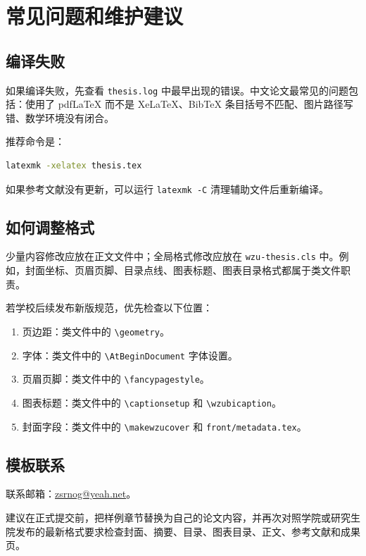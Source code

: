 \chapter{常见问题和维护建议}

\section{编译失败}

如果编译失败，先查看 \texttt{thesis.log} 中最早出现的错误。中文论文最常见的问题包括：使用了 pdfLaTeX 而不是 XeLaTeX、BibTeX 条目括号不匹配、图片路径写错、数学环境没有闭合。

推荐命令是：

\begin{lstlisting}[language=bash]
latexmk -xelatex thesis.tex
\end{lstlisting}

如果参考文献没有更新，可以运行 \texttt{latexmk -C} 清理辅助文件后重新编译。

\section{如何调整格式}

少量内容修改应放在正文文件中；全局格式修改应放在 \texttt{wzu-thesis.cls} 中。例如，封面坐标、页眉页脚、目录点线、图表标题、图表目录格式都属于类文件职责。

若学校后续发布新版规范，优先检查以下位置：

\begin{enumerate}
  \item 页边距：类文件中的 \verb|\geometry|。
  \item 字体：类文件中的 \verb|\AtBeginDocument| 字体设置。
  \item 页眉页脚：类文件中的 \verb|\fancypagestyle|。
  \item 图表标题：类文件中的 \verb|\captionsetup| 和 \verb|\wzubicaption|。
  \item 封面字段：类文件中的 \verb|\makewzucover| 和 \texttt{front/metadata.tex}。
\end{enumerate}

\section{模板联系}

联系邮箱：\href{mailto:zsrnog@yeah.net}{zsrnog@yeah.net}。

建议在正式提交前，把样例章节替换为自己的论文内容，并再次对照学院或研究生院发布的最新格式要求检查封面、摘要、目录、图表目录、正文、参考文献和成果页。
